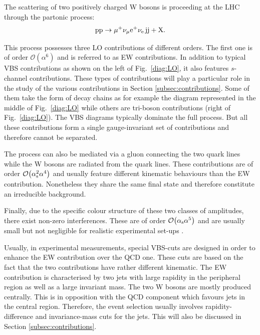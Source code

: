 The scattering of two positively charged W bosons is proceeding at the LHC through the partonic process:
%
\begin{equation}
\text{p}\text{p}\to\mu^+\nu_\mu{\rm e}^+\nu_{\rm e}\,\text{j}\text{j}+\mathrm{X}.
\end{equation}

This process possesses three LO contributions of different orders.
The first one is of order $\mathcal{O}{\left(\alpha^{6}\right)}$ and is referred to as EW contributions.
In addition to typical VBS contributions as shown on the left of Fig.~\ref{diag:LO}, it also features $s$-channel contributions.
These types of contributions will play a particular role in the study of the various contributions in Section \ref{subsec:contributions}.
Some of them take the form of decay chains as for example the diagram represented in the middle of Fig.~\ref{diag:LO} while others are tri-boson contributions (right of Fig.~\ref{diag:LO}).
The VBS diagrams typically dominate the full process.
But all these contributions form a single gauge-invariant set of contributions and therefore cannot be separated.

The process can also be mediated via a gluon connecting the two quark lines while the W bosons are radiated from the quark lines.
These contributions are of order $\mathcal{O}{\left(\alpha_\text{s}^{2}\alpha^{4}\right)}$ and usually feature different kinematic behaviours than the EW contribution.
Nonetheless they share the same final state and therefore constitute an irreducible background.

Finally, due to the specific colour structure of these two classes of amplitudes, there exist non-zero interferences.
These are of order $\mathcal{O}{\left(\alpha_{\rm s}\alpha^{5}\right)}$ and are usually small but not negligible for realistic experimental set-ups \cite{Biedermann:2017bss}.

Usually, in experimental measurements, special VBS-cuts are designed in order to enhance the EW contribution over the QCD one.
These cuts are based on the fact that the two contributions have rather different kinematic.
The EW contribution is characterised by two jets with large rapidity in the peripheral region as well as a large invariant mass.
The two W bosons are mostly produced centrally.
This is in opposition with the QCD component which favours jets in the central region.
Therefore, the event selection usually involves rapidity-difference and invariance-mass cuts for the jets.
This will also be discussed in Section \ref{subsec:contributions}.

